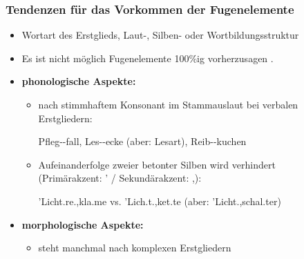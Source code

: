 \begin{frame}
\frametitle{Tendenzen für das Vorkommen der Fugenelemente}

\begin{itemize}
	\item Wortart des Erstglieds, Laut-, Silben- oder Wortbildungsstruktur 
	
	\item Es ist nicht möglich Fugenelemente 100\%ig vorherzusagen \citep[vgl.][]{Fuhrhop96a}.

\pause
	
	\item \textbf{phonologische Aspekte:}
	
	\begin{itemize}
		\item \textipa{[@]} nach stimmhaftem Konsonant im Stammauslaut bei verbalen Erstgliedern:
		
		\ea Pfleg--fall, Les--ecke (aber: Lesart), Reib--kuchen
		\z
		
		\item Aufeinanderfolge zweier betonter Silben wird verhindert\\
		(Primärakzent: ' / Sekundärakzent: ,):
		
		\ea 'Licht.\alertred{\_}re.,kla.me vs. 'Lich.t.,ket.te (aber: 'Licht\alertred{\_}.,schal.ter)
		\z
			
	\end{itemize}

\pause 

	\item \textbf{morphologische Aspekte:}
	
	\begin{itemize}
		\item {} steht manchmal nach komplexen Erstgliedern

		\z 
	\end{itemize}

\end{itemize}

\end{frame}


